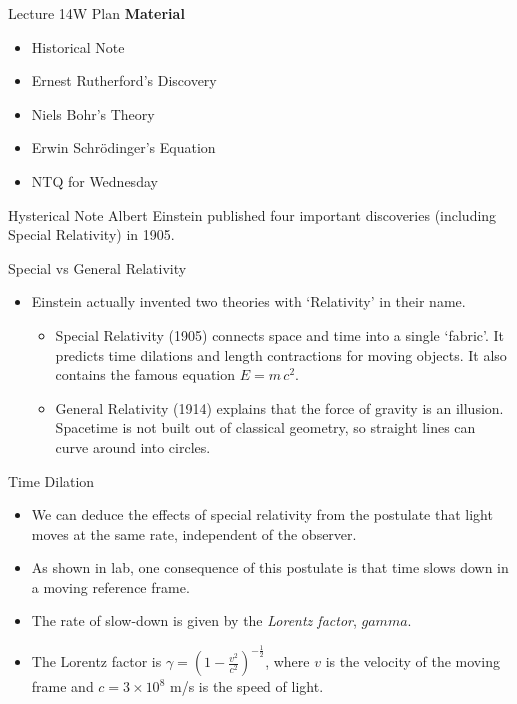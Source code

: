\documentclass[english]{beamer}
\begin{document}
\begin{frame}{Lecture 14W Plan}
  \textbf{Material}
  \begin{itemize}
    \item Historical Note
    \item Ernest Rutherford's Discovery
    \item Niels Bohr's Theory
    \item Erwin Schr{\"o}dinger's Equation
    \item NTQ for Wednesday
  \end{itemize}
\end{frame}

\begin{frame}{Hysterical Note}
  Albert Einstein published four important discoveries (including Special Relativity) in 1905.
\end{frame}

\begin{frame}{Special vs General Relativity}
  \begin{itemize}
    \item Einstein actually invented two theories with `Relativity' in their name.
    \begin{itemize}
      \item Special Relativity (1905) connects space and time into a single `fabric'. It predicts time dilations and length contractions for moving objects. It also contains the famous equation $E=m\,c^2$.
      \item General Relativity (1914) explains that the force of gravity is an illusion. Spacetime is not built out of classical geometry, so straight lines can curve around into circles.
    \end{itemize}
  \end{itemize}
\end{frame}

\begin{frame}{Time Dilation}
  \begin{itemize}
    \item We can deduce the effects of special relativity from the postulate that light moves at the same rate, independent of the observer.
    \item As shown in lab, one consequence of this postulate is that time slows down in a moving reference frame.
    \item The rate of slow-down is given by the \textit{Lorentz factor}, $gamma$.
    \item The Lorentz factor is $\gamma = \left( 1 - \frac{v^2}{c^2} \right)^{-\frac{1}{2}}$, where $v$ is the velocity of the moving frame and $c=3\times10^8$ m/s is the speed of light.
  \end{itemize}
\end{frame}
\end{document}
